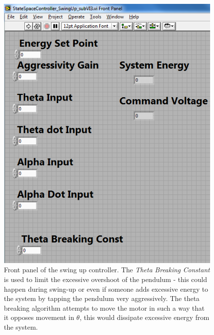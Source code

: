 \documentclass{article}
\theoremstyle{plain}
\theoremstyle{definition}
\theoremstyle{remark}
\begin{document}
\begin{figure}[htb]
\begin{center}
\includegraphics[width = 12cm]{q6_b3.png}
\end{center}
\caption{Front panel of the swing up controller. The \emph{Theta Breaking Constant} is used to limit the excessive overshoot of the pendulum - this could happen during swing-up or even if someone adds excessive energy to the system by tapping the pendulum very aggressively. The theta breaking algorithm attempts to move the motor in such a way that it opposes movement in $\theta$, this would dissipate excessive energy from the system.}
\label{q6_b3}
\end{figure}
\end{document}
